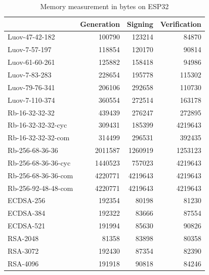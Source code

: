 \documentclass[thesis=M,english]{FITthesis}[2019/12/23]
\begin{document}
\begin{table}[]
\centering
\begin{tabular}{|l|r|r|r|}
\hline
                    & \multicolumn{1}{l|}{Generation} & \multicolumn{1}{l|}{Signing} & \multicolumn{1}{l|}{Verification} \\ \hline
Luov-47-42-182      & 100790                          & 123214                       & 84870                             \\ \hline
Luov-7-57-197       & 118854                          & 120170                       & 90814                             \\ \hline
Luov-61-60-261      & 125882                          & 158418                       & 94986                             \\ \hline
Luov-7-83-283       & 228654                          & 195778                       & 115302                            \\ \hline
Luov-79-76-341      & 206106                          & 292658                       & 110730                            \\ \hline
Luov-7-110-374      & 360554                          & 272514                       & 163178                            \\ \hline
Rb-16-32-32-32      & 439439                          & 276247                       & 272895                            \\ \hline
Rb-16-32-32-32-cyc  & 309431                          & 185399                       & 4219643                           \\ \hline
Rb-16-32-32-32-com  & 314499                          & 296531                       & 392435                            \\ \hline
Rb-256-68-36-36     & 2011587                         & 1260919                      & 1253123                           \\ \hline
Rb-256-68-36-36-cyc & 1440523                         & 757023                       & 4219643                           \\ \hline
Rb-256-68-36-36-com & 4220771                         & 4219643                      & 4219643                           \\ \hline
Rb-256-92-48-48-com & 4220771                         & 4219643                      & 4219643                           \\ \hline
 ECDSA-256 &  192354   &  80198 &  81230      \\ \hline
 ECDSA-384 &  192322   &  83666 &  87554      \\ \hline
 ECDSA-521 &  191994   &  85630 &  90826      \\ \hline
 RSA-2048  &  81358    &  83898 &  80358      \\ \hline
 RSA-3072  &  192430   &  87354 &  82390      \\ \hline
 RSA-4096  &  191918   &  90818 &  84246      \\ \hline
\end{tabular}
\caption{Memory measurement in bytes on ESP32}
\end{table}
\end{document}
